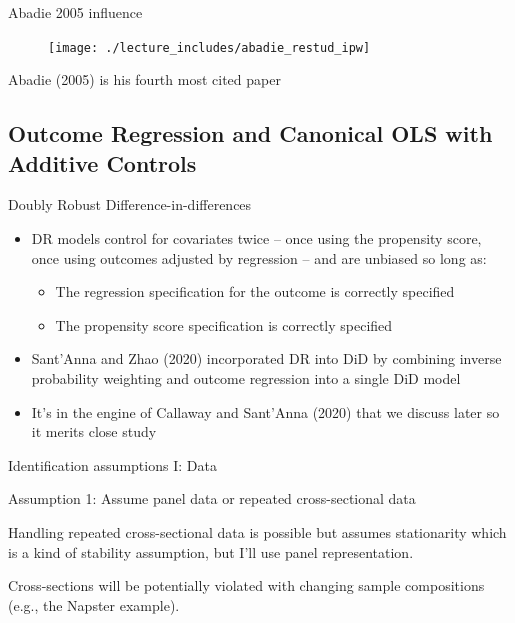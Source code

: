 \documentclass{beamer}
\begin{document}
\begin{frame}{Abadie 2005 influence}

	\begin{figure}
	\texttt{[image: ./lecture\_includes/abadie\_restud\_ipw]}
	\end{figure}Abadie (2005) is his fourth most cited paper

\end{frame}




\subsection{Outcome Regression and Canonical OLS with Additive Controls}



\begin{frame}{Doubly Robust Difference-in-differences}

\begin{itemize}
\item DR models control for covariates twice -- once using the propensity score, once using outcomes adjusted by regression -- and are unbiased so long as:
	\begin{itemize}
	\item The regression specification for the outcome is correctly specified
	\item The propensity score specification is correctly specified
	\end{itemize}
\item Sant'Anna and Zhao (2020) incorporated DR into DiD by combining inverse probability weighting and outcome regression into a single DiD model
\item It's in the engine of Callaway and Sant'Anna (2020) that we discuss later so it merits close study
\end{itemize}

\end{frame}




\begin{frame}{Identification assumptions I: Data}

Assumption 1: Assume panel data or repeated cross-sectional data

\bigskip

Handling repeated cross-sectional data is possible but assumes stationarity which is a kind of stability assumption, but I'll use panel representation. 

\bigskip

Cross-sections will be potentially violated with changing sample compositions (e.g., the Napster example). 

\end{frame}
\end{document}
